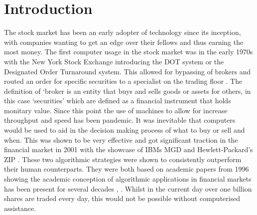\documentclass[conference]{IEEEtran}
\begin{document}
\iffalse
#################################################################################
\fi

\section{Introduction}

\iffalse
This section briefly introduces the general project background, the research question you are addressing, and the project objectives.  It should be between 2 to 3 pages in length.  Do not change the font sizes or line spacing in order to put in more text.

- Same as the aims just longer.\\
- What is the aim for a year?\\
- Objectives.\\
- What is the state of the art in the field?\\
- A bit of the history of trading.\\
\fi

The stock market has been an early adopter of technology since its inception, with companies wanting to get an edge over their fellows and thus earning the most money. The first computer usage in the stock market was in the early 1970s with the New York Stock Exchange introducing the DOT system or the Designated Order Turnaround system. This allowed for bypassing of brokers and routed an order for specific securities to a specialist on the trading floor \cite{Hasbrouck}. The definition of `broker is an entity that buys and sells goods or assets for others, in this case `securities' which are defined as a financial instrument that holds monitary value. Since this point the use of machines to allow for increase throughput and speed has been pandemic. It was inevitable that computers would be used to aid in the decision making process of what to buy or sell and when. This was shown to be very effective and got significant traction in the financial market in 2001 with the showcase of IBMs MGD and  Hewlett-Packard's ZIP \cite{Tesauro2001}. These two algorithmic strategies were shown to consistently outperform their human counterparts. They were both based on academic papers from 1996 showing the academic conception of algorithmic applications in financial markets has been present for several decades \cite{Gjerstad1998}, \cite{Cliff1998}. Whilst in the current day over one billion shares are traded every day, this would not be possible without computerised assistance. 
\end{document}
